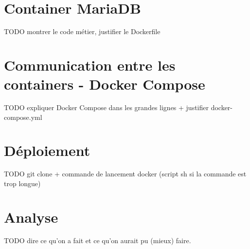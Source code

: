 \documentclass[11pt,a4paper,oneside]{report}
\begin{document}
\section{Container MariaDB}
TODO montrer le code métier, justifier le Dockerfile

\section{Communication entre les containers - Docker Compose}
TODO expliquer Docker Compose dans les grandes lignes + justifier docker-compose.yml

\section{Déploiement}
TODO git clone + commande de lancement docker (script sh si la commande est trop longue)

\section{Analyse}
TODO dire ce qu'on a fait et ce qu'on aurait pu (mieux) faire.
\end{document}
